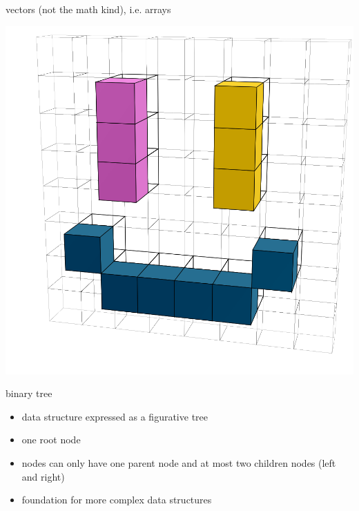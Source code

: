 \documentclass{beamer}
\begin{document}
	\begin{frame}{vectors (not the math kind), i.e. arrays}
		\begin{center}
			\includegraphics[width=\linewidth,height=0.85\textheight,keepaspectratio]{../assets/3d-array-rotated.png}
		\end{center}
	\end{frame}
	
	\begin{frame}{binary tree}
		\begin{itemize}
			\item[] data structure expressed as a figurative tree
			\item[] one root node
			\item[] nodes can only have one parent node and at most two children nodes (left and right)
			\item[] foundation for more complex data structures
		\end{itemize}
	\end{frame}
\end{document}
